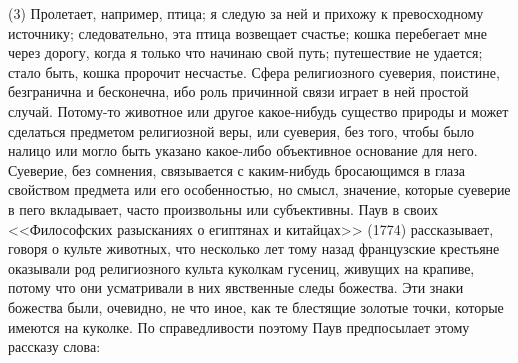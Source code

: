 \documentclass[12pt]{article}
\begin{document}
(3) Пролетает, например, птица; я следую за ней и прихожу к превосходному источнику; следовательно, эта птица возвещает счастье; кошка перебегает мне через дорогу, когда я только что начинаю свой путь; путешествие не удается; стало быть, кошка пророчит несчастье. Сфера религиозного суеверия, поистине, безгранична и бесконечна, ибо роль причинной связи играет в ней простой случай. Потому-то животное или другое какое-нибудь существо природы и может сделаться предметом религиозной веры, или суеверия, без того, чтобы было налицо или могло быть указано какое-либо объективное основание для него. Суеверие, без сомнения, связывается с каким-нибудь бросающимся в глаза свойством предмета или его особенностью, но смысл, значение, которые суеверие в пего вкладывает, часто произвольны или субъективны. Паув в своих <<Философских разысканиях о египтянах и китайцах>> (1774) рассказывает, говоря о культе животных, что несколько лет тому назад французские крестьяне оказывали род религиозного культа куколкам гусениц, живущих на крапиве, потому что они усматривали в них явственные следы божества. Эти знаки божества были, очевидно, не что иное, как те блестящие золотые точки, которые имеются на куколке. По справедливости поэтому Паув предпосылает этому рассказу слова: 
\end{document}
